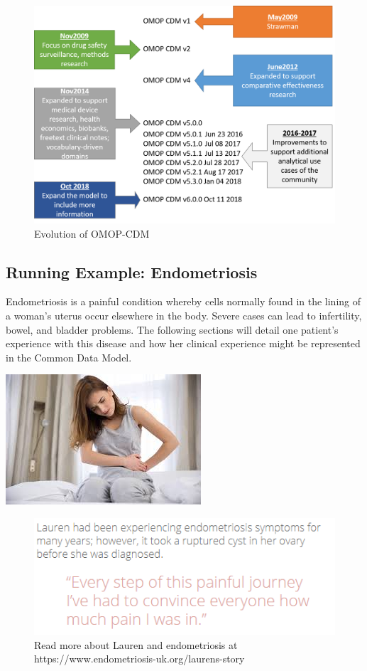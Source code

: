 \documentclass[]{book}
\begin{document}
\begin{figure}
\includegraphics[width=0.8\linewidth]{images/CommonDataModel/history_of_CDM} \caption{Evolution of OMOP-CDM}\label{fig:cdmHistory}
\end{figure}

\hypertarget{running-example-endometriosis}{%
\subsection{Running Example: Endometriosis}\label{running-example-endometriosis}}

Endometriosis is a painful condition whereby cells normally found in the lining of a woman's uterus occur elsewhere in the body. Severe cases can lead to infertility, bowel, and bladder problems. The following sections will detail one patient's experience with this disease and how her clinical experience might be represented in the Common Data Model.

\includegraphics[width=0.5\linewidth]{images/CommonDataModel/Lauren}

\begin{figure}
\includegraphics[width=0.75\linewidth]{images/CommonDataModel/laurentext} \caption{Read more about Lauren and endometriosis at https://www.endometriosis-uk.org/laurens-story}\label{fig:Laurentext}
\end{figure}
\end{document}
